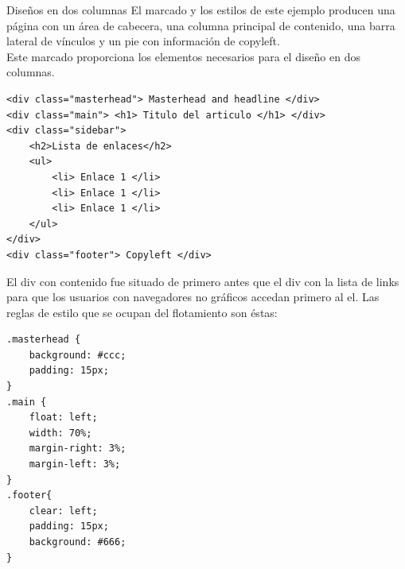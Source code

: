 \begin{frame}{Diseños en dos columnas} %
    El marcado y los estilos de este ejemplo producen una página con un área de
    cabecera, una columna principal de contenido, una barra lateral de vínculos
    y un pie con información de copyleft. \\[0.5cm]

    Este marcado proporciona los elementos necesarios para el diseño en dos
    columnas. 
    \begin{lstlisting}
<div class="masterhead"> Masterhead and headline </div> 
<div class="main"> <h1> Titulo del articulo </h1> </div>
<div class="sidebar">
    <h2>Lista de enlaces</h2> 
    <ul>
        <li> Enlace 1 </li>
        <li> Enlace 1 </li>
        <li> Enlace 1 </li>
    </ul>
</div>
<div class="footer"> Copyleft </div>
    \end{lstlisting}
    El div con contenido fue situado de primero antes que el div con la lista
    de links para que los usuarios con navegadores no gráficos accedan primero
    al el. Las reglas de estilo que se ocupan del flotamiento son éstas: 

    \begin{lstlisting}
.masterhead {
    background: #ccc;
    padding: 15px;
}
.main {
    float: left;
    width: 70%;
    margin-right: 3%;
    margin-left: 3%;
}
.footer{
    clear: left;
    padding: 15px;
    background: #666;
}
    \end{lstlisting}
\end{frame}



